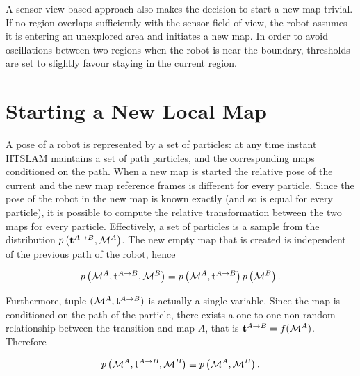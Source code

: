 A sensor view based approach also makes the decision to start a new
map trivial. If no region overlaps sufficiently with the sensor field
of view, the robot assumes it is entering an unexplored area and
initiates a new map. In order to avoid oscillations between two
regions when the robot is near the boundary, thresholds are set to
slightly favour staying in the current region.


\section{Starting a New Local Map}
\label{sec:starting_new_map}


A pose of a robot is represented by a set of particles: at any time
instant HTSLAM maintains a set of path particles, and the
corresponding maps conditioned on the path. When a new map is started
the relative pose of the current and the new map reference frames is
different for every particle. Since the pose of the robot in the new
map is known exactly (and so is equal for every particle), it is
possible to compute the relative transformation between the two maps
for every particle. Effectively, a set of particles is a sample from
the distribution $\prob{\tr{}{A}{B},\mapA}$.  The new empty map that
is created is independent of the previous path of the robot, hence

$$
 \prob{\mapA,\tr{}{A}{B},\mapB} = \prob{\mapA,\tr{}{A}{B}}\prob{\mapB}.
$$

Furthermore, tuple $(\mapA, \tr{}{A}{B})$ is actually a single variable.
Since the map is conditioned on the path of the particle, there exists a
one to one non-random relationship between the transition and map $A$,
that is $\tr{}{A}{B} = f(\mapA)$. Therefore

$$
\prob{\mapA,\tr{}{A}{B},\mapB} \equiv \prob{\mapA,\mapB}.
$$


